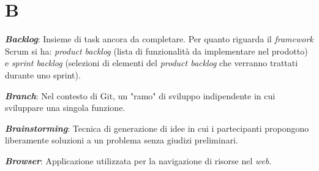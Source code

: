 \documentclass[5pt]{article}
\begin{document}
\section*{B}
\begin{flushleft}
	
\textbf{\textit{Backlog}}: Insieme di task ancora da completare. Per quanto riguarda il \textit{framework} Scrum si ha: \textit{product backlog} (lista di funzionalità da implementare nel prodotto) e \textit{sprint backlog} (selezioni di elementi del \textit{product backlog} che verranno trattati durante uno sprint).\newline
	
\textbf{\textit{Branch}}: Nel contesto di Git, un "ramo" di sviluppo indipendente in cui sviluppare una singola funzione.\newline

\textbf{\textit{Brainstorming}}: Tecnica di generazione di idee in cui i partecipanti propongono liberamente soluzioni a un problema senza giudizi preliminari.\newline

	
\textbf{\textit{Browser}}: Applicazione utilizzata per la navigazione di risorse nel \textit{web}. 	
	
\end{flushleft}

\pagebreak
\end{document}
